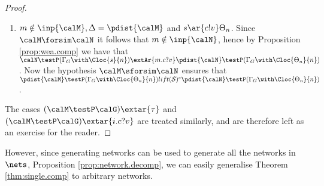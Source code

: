 \documentclass{LMCS}
\begin{document}
\begin{proof}
\begin{enumerate}[label=(\roman*)]
\item $m \notin \inp{\calM}, \Delta = \pdist{\calM}$ and 
$s \ar{c!v} \Theta_n$. Since $\calM \forsim \calN$ it follows that 
$m \notin \inp{\calN}$, hence by Proposition 
\ref{prop:wea.comp} we have that $\calN \testP (\Gamma_G \with \Cloc{s}{n}) 
\extAr{m.c?v} \pdist{\calN} \testP (\Gamma_G \with \Cloc{\Theta_n}{n})$. 
Now the hypothesis $\calM \sforsim \calN$ ensures that 
$\pdist{\calM} \testP (\Gamma_G \with \Cloc{\Theta_n}{n}) lift{({\mathcal S})^e} 
\pdist{\calN} \testP (\Gamma_G \with \Cloc{\Theta_n}{n})$.


\end{enumerate}

\noindent The cases $(\calM \testP \calG) \extar{\tau}$ and 
$(\calM \testP \calG) \extar{i.c?v}$ are 
treated similarly, and are therefore left as an 
exercise for the reader.
\end{proof}

However, since generating networks can be used to generate 
all the networks in $\nets$, Proposition  
\ref{prop:network.decomp}, we can 
easily generalise Theorem \ref{thm:single.comp} to arbitrary 
networks.
\end{document}
